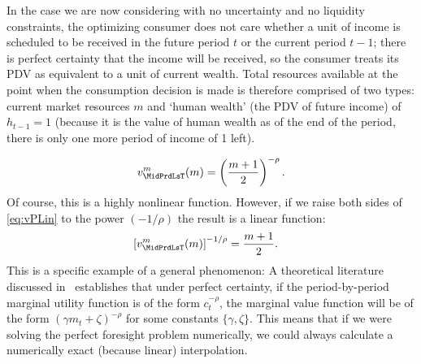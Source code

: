 \documentclass[titlepage, headings=optiontotocandhead]{econtex}
\begin{document}
In the case we are now considering with no uncertainty and no liquidity constraints, the optimizing consumer does not care whether a unit of income is scheduled to be received in the future period $t$ or the current period $t-1$; there is perfect certainty that the income will be received, so the consumer treats its PDV as equivalent to a unit of current wealth.  Total resources available at the point when the consumption decision is made is therefore comprised of two types: current market resources $m$ and `human wealth' (the PDV of future income) of $h_{t-1}=1$ (because it is the value of human wealth as of the end of the period, there is only one more period of income of 1 left).

\begin{equation}
  v^{m}_{\MidPrdLsT}(m)  = \left(\frac{m+1}{2}\right)^{-\rho} \label{eq:vPLin}.
\end{equation}
Of course, this is a highly nonlinear function.  However, if we raise both sides of \eqref{eq:vPLin} to the power $(-1/\rho)$ the result is a linear function:
\begin{equation}\begin{gathered}\begin{aligned}
      \left[v^{m}_{\MidPrdLsT}(m)\right]^{-1/\rho}  & = \frac{m+1}{2}  .
    \end{aligned}\end{gathered}\end{equation}
This is a specific example of a general phenomenon: A theoretical literature discussed in~\cite{ckConcavity} establishes that under perfect certainty, if the period-by-period marginal utility function is of the form $c_{t}^{-\rho}$, the marginal value function will be of the form $(\gamma m_{t}+\zeta)^{-\rho}$ for some constants $\{\gamma,\zeta\}$.  This means that if we were solving the perfect foresight problem numerically, we could always calculate a numerically exact (because linear) interpolation.
\end{document}
